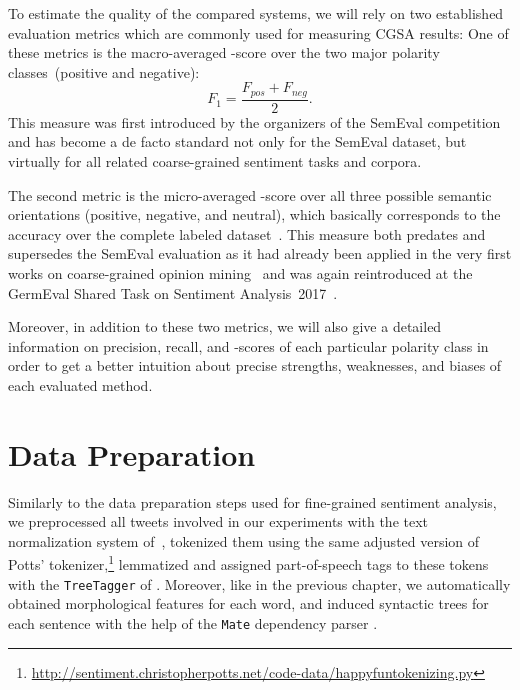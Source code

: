 To estimate the quality of the compared systems, we will rely on two
established evaluation metrics which are commonly used for measuring
CGSA results: One of these metrics is the macro-averaged \F-score over
the two major polarity classes~(positive and negative): { \small%
  \begin{equation*}
    F_1 = \frac{F_{pos} + F_{neg}}{2}.
  \end{equation*}%
  \normalsize%
}%
This measure was first introduced by the organizers of the SemEval
competition~\cite{Nakov:13,Rosenthal:14,Rosenthal:15} and has become a
de facto standard not only for the SemEval dataset, but virtually for
all related coarse-grained sentiment tasks and corpora.

The second metric is the micro-averaged \F-score over all three
possible semantic orientations (positive, negative, and neutral),
which basically corresponds to the accuracy over the complete labeled
dataset~\cite[see][p.~577]{Manning:99}.  This measure both predates
and supersedes the SemEval evaluation as it had already been applied
in the very first works on coarse-grained opinion
mining~\cite{Wiebe:99,Das:01,Read:05,Kennedy:06,Go:09} and was again
reintroduced at the GermEval Shared Task on Sentiment
Analysis~2017~\cite{Wojatzki:17}.

Moreover, in addition to these two metrics, we will also give a
detailed information on precision, recall, and \F-scores of each
particular polarity class in order to get a better intuition about
precise strengths, weaknesses, and biases of each evaluated method.

\section{Data Preparation}\label{sec:cgsa:data}

Similarly to the data preparation steps used for fine-grained
sentiment analysis, we preprocessed all tweets involved in our
experiments with the text normalization system
of~\citet{Sidarenka:13}, tokenized them using the same adjusted
version of Potts'
tokenizer,\footnote{\url{http://sentiment.christopherpotts.net/code-data/happyfuntokenizing.py}}
lemmatized and assigned part-of-speech tags to these tokens with the
\texttt{TreeTagger} of \citet{Schmid:95}.  Moreover, like in the
previous chapter, we automatically obtained morphological features for
each word, and induced syntactic trees for each sentence with the help
of the \texttt{Mate} dependency parser
\cite{Bohnet:13}. %

